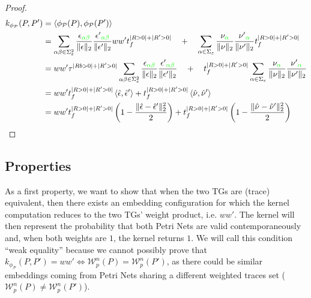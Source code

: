 \begin{proof}
$$\begin{aligned}
k_{\phi_{\mathcal{P}}}(P,P')&=\Braket{\phi_{\mathcal{P}}(P),\phi_{\mathcal{P}}(P')}\\
	&=\sum_{\alpha\beta\in \Sigma_\varepsilon^2}\frac{\epsilon_{\color{green}\alpha\beta}}{\|\epsilon\|_2}\frac{{\epsilon'}_{\color{green}\alpha\beta}}{\|\epsilon'\|_2}ww't_f^{|R>0|+|R'>0|}\quad+\quad \sum_{\alpha\in \Sigma_\varepsilon}\frac{\nu_{\color{green}\alpha}}{\|\nu\|_2}\frac{{\nu'}_{\color{green}\alpha}}{\|\nu'\|_2}t_f^{|R>0|+|R'>0|}\\
	&=ww'\tau^{|Rb>0|+|R'>0|}\sum_{\alpha\beta\in \Sigma_\varepsilon^2}\frac{\epsilon_{\color{green}\alpha\beta}}{\|\epsilon\|_2}\frac{{\epsilon'}_{\color{green}\alpha\beta}}{\|\epsilon'\|_2}\quad+\quad t_f^{|R>0|+|R'>0|}\sum_{\alpha\in \Sigma_\varepsilon}\frac{\nu_{\color{green}\alpha}}{\|\nu\|_2}\frac{{\nu'}_{\color{green}\alpha}}{\|\nu'\|_2}\\
	&=ww't_f^{|R>0|+|R'>0|}\Braket{\hat{\epsilon}, \hat{\epsilon}'}+ t_f^{|R>0|+|R'>0|}\Braket{\hat{\nu}, \hat{\nu}'}\\
	&=ww't_f^{|R>0|+|R'>0|}\left(1-\frac{\|\hat{\epsilon}- \hat{\epsilon}'\|_{2}^2}{2}\right)+ t_f^{|R>0|+|R'>0|}\left(1-\frac{\|\hat{\nu}- \hat{\nu}'\|_{2}^2}{2}\right)\\
\end{aligned}$$
\end{proof}

\subsection{Properties}
As a first property, we want to show that when the two TGs are (trace) equivalent, then there exists an embedding configuration for which the kernel computation reduces to the two TGs' weight product, i.e. $ww'$. The kernel will then represent the probability that both Petri Nets are valid contemporaneously and, when both weights are $1$, the kernel returns $1$. We will call this condition  ``weak equality'' because we cannot possibly prove that $k_{\phi_{\mathcal{P}}}(P,P')=ww'\Leftrightarrow \mathcal{W}_p^n(P)=\mathcal{W}_p^n(P')$, as there could be similar embeddings coming from Petri Nets sharing a different weighted traces set ($\mathcal{W}_p^n(P)\neq\mathcal{W}_p^n(P')$).

